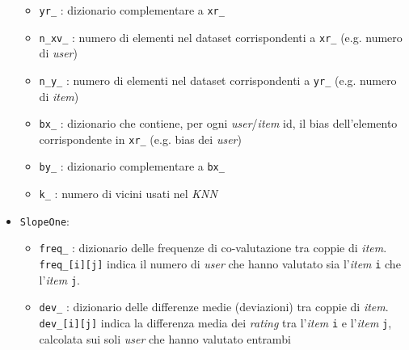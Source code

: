 \begin{itemize}
\begin{itemize}
        \item \texttt{yr\_} : dizionario complementare a \texttt{xr\_}
        \item \texttt{n\_xv\_} : numero di elementi nel dataset corrispondenti a \texttt{xr\_} (e.g. numero di \textit{user})
        \item \texttt{n\_y\_} : numero di elementi nel dataset corrispondenti a \texttt{yr\_} (e.g. numero di \textit{item})
        \item \texttt{bx\_} : dizionario che contiene, per ogni \textit{user}/\textit{item} id, il bias dell'elemento corrispondente in \texttt{xr\_} (e.g. bias dei \textit{user})
        \item \texttt{by\_} : dizionario complementare a \texttt{bx\_}
        \item \texttt{k\_} : numero di vicini usati nel \textit{KNN}
    \end{itemize}

    \item \texttt{SlopeOne}:
    \begin{itemize}
        \item \texttt{freq\_} : dizionario delle frequenze di co-valutazione tra coppie di \textit{item}. \texttt{freq\_[i][j]} indica il numero di \textit{user} che hanno valutato sia l'\textit{item} \texttt{i} che l'\textit{item} \texttt{j}.
        \item \texttt{dev\_} : dizionario delle differenze medie (deviazioni) tra coppie di \textit{item}. \texttt{dev\_[i][j]} indica la differenza media dei \textit{rating} tra l'\textit{item} \texttt{i} e l'\textit{item} \texttt{j}, calcolata sui soli \textit{user} che hanno valutato entrambi


\end{itemize}
\end{itemize}
